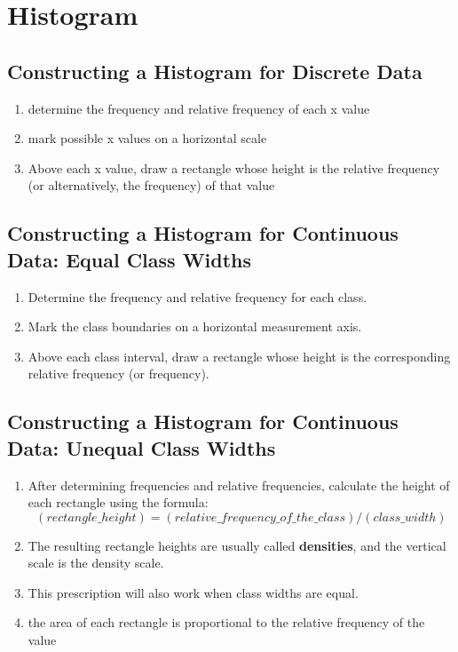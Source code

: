 
\section{Histogram \cite{ism-2, wiki-histogram}}\label{histogram}
\subsection{Constructing a Histogram for Discrete Data}
\begin{enumerate}
    \item determine the frequency and relative frequency of each x value
    \item mark possible x values on a horizontal scale
    \item Above each x value, draw a rectangle whose height is the relative frequency (or alternatively, the frequency) of that value
\end{enumerate}

\subsection{Constructing a Histogram for Continuous Data: Equal Class Widths}
\begin{enumerate}
    \item Determine the frequency and relative frequency for each class.
    \item Mark the class boundaries on a horizontal measurement axis.
    \item Above each class interval, draw a rectangle whose height is the corresponding relative frequency (or frequency).
\end{enumerate}

\subsection{Constructing a Histogram for Continuous Data: Unequal Class Widths}
\begin{enumerate}
    \item After determining frequencies and relative frequencies, calculate the height of each rectangle using the formula:
    \begin{equation}
        (rectangle\_height) = (relative\_frequency\_of\_the\_class) / (class\_width)
    \end{equation}
    \item The resulting rectangle heights are usually called \textbf{densities}, and the vertical scale is the density scale. 
    \item This prescription will also work when class widths are equal. 
    \item the area of each rectangle is proportional to the relative frequency of the value
\end{enumerate}

